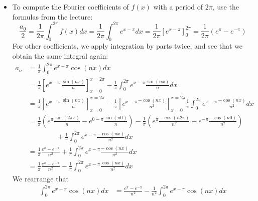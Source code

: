 \documentclass[11pt]{article}
\begin{document}
\begin{solution}     
    \begin{itemize}
    \item To compute the Fourier coefficients of $f(x)$ with a period of $2\pi$, use the formulas from the lecture:
    \[
        \frac{ a_0 }{2}
        = 
        \frac{1}{2\pi}\int_{0}^{2\pi} f(x) dx  = \frac{1}{2\pi}\int_{0}^{2\pi} e^{x-\pi} dx  = \frac{1}{2\pi}\left[ e^{x-\pi} \right]_{0}^{2\pi} = \frac{1}{2\pi}\left(e^{\pi} - e^{-\pi}\right)
    \]
    For other coefficients, we apply integration by parts twice, and see that we obtain the same integral again:
    \begin{align*}
        a_n 
        &
        = 
        \frac{1}{\pi}
        \int_{0}^{2\pi} e^{x - \pi} \cos( n x) dx
        \\&
        =
        \frac{1}{\pi}
        \left[ e^{x - \pi} \frac{ \sin(n x) }{ n } \right]_{x=0}^{x=2\pi}
        -
        \frac{1}{\pi}
        \int_{0}^{2\pi} e^{x-\pi}\frac{ \sin( n x) }{ n } dx
        \\&
        =
        \frac{1}{\pi}
        \left[ e^{x - \pi} \frac{ \sin(n x) }{ n } \right]_{x=0}^{x=2\pi}
        -
        \frac{1}{\pi}
        \left[ e^{x - \pi} \frac{ -\cos(n x) }{ n^2 } \right]_{x=0}^{x=2\pi}
        \frac{1}{\pi}
        \int_{0}^{2\pi} e^{x-\pi}\frac{ -\cos(n x) }{ n^2 } dx
        \\&
        =
        \frac{1}{\pi}
        \left( e^{\pi} \frac{ \sin(2\pi x) }{ n } - e^{0 - \pi} \frac{ \sin(n 0) }{ n } \right)
        -
        \frac{1}{\pi}
        \left( e^{\pi} \frac{ -\cos(n 2\pi) }{ n^2 } - e^{- \pi} \frac{ -\cos(n 0) }{ n^2 } \right)
        \\&\qquad\qquad
        +
        \frac{1}{\pi}
        \int_{0}^{2\pi} e^{x-\pi}\frac{ -\cos(n x) }{ n^2 } dx
        \\&
        =
        \frac{1}{\pi}\frac{e^{\pi} - e^{-\pi}}{n^2}
        +
        \frac{1}{\pi}
        \int_{0}^{2\pi} e^{x-\pi}\frac{ -\cos(n x) }{ n^2 } dx
        \\&
        =
        \frac{1}{\pi}\frac{e^{\pi} - e^{-\pi}}{n^2}
        -
        \frac{1}{\pi}
        \int_{0}^{2\pi} e^{x-\pi}\frac{ \cos(n x) }{ n^2 } dx
        \end{align*}
        We rearrange that 
        \begin{align*}
            \int_{0}^{2\pi} e^{x-\pi} \cos(n x) dx
            &=
            \frac{e^{\pi} - e^{-\pi}}{ n^2}
            -
            \frac{1}{n^2}
            \int_{0}^{2\pi} e^{x-\pi} \cos(n x) dx

\end{align*}
\end{itemize}
\end{solution}
\end{document}
